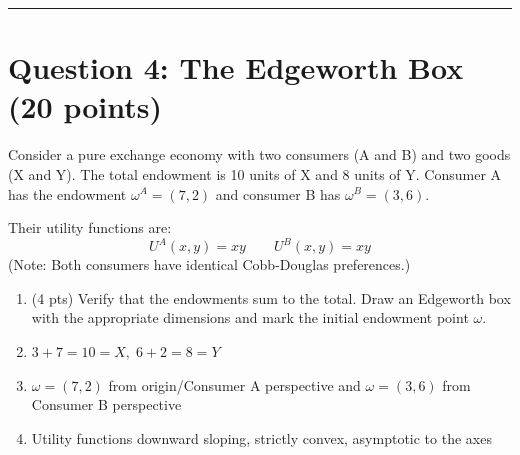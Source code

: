 \documentclass[11pt]{article}
\begin{document}
\vspace{0em}
\noindent\rule{\textwidth}{0.4pt}

\section*{Question 4: The Edgeworth Box (20 points)}

Consider a pure exchange economy with two consumers (A and B) and two goods (X and Y). The total endowment is 10 units of X and 8 units of Y. Consumer A has the endowment $\omega^A = (7, 2)$ and consumer B has $\omega^B = (3, 6)$.

Their utility functions are:
\[
U^A(x, y) = xy \qquad U^B(x, y) = xy
\]
(Note: Both consumers have identical Cobb-Douglas preferences.)

\begin{enumerate}[label=(\alph*)]
    \item (4 pts) Verify that the endowments sum to the total. Draw an Edgeworth box with the appropriate dimensions and mark the initial endowment point $\omega$.
    \item[] $3+7=10=X,\; 6+2=8=Y$
    \item[] $\omega=(7,2)$ from origin/Consumer A perspective and $\omega=(3,6)$ from Consumer B perspective
    \item[] Utility functions downward sloping, strictly convex, asymptotic to the axes
    \begin{center}
\end{center}
\end{enumerate}
\end{document}
